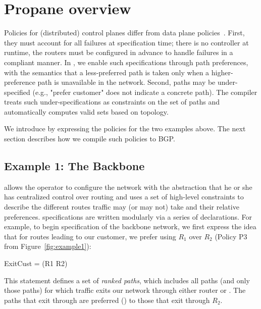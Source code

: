 \section{Propane overview}
\label{sec:propane}

Policies for (distributed) control planes differ from data plane policies~\cite{x,y,z}. First, they must account for all failures at specification time; there is no controller at runtime, the routers must be configured in advance to handle failures in a compliant manner.
%
In \sysname, we enable such specifications through path preferences, with the semantics that a less-preferred path is taken only when a higher-preference path is unavailable in the network.
%
Second, paths may be under-specified (e.g., "prefer customer" does not indicate a concrete path). The \sysname compiler treats such under-specifications as constraints on the set of paths and automatically computes valid sets based on topology.




We introduce \sysname by expressing the policies for the two examples above.
%
The next section describes how we compile such policies to BGP.

\subsection{Example 1: The Backbone}


\sysname allows the operator to configure the network with the abstraction that he or she has centralized control over routing and uses a set of high-level constraints to describe the different routes traffic may (or may not) take and their relative preferences.
\sysname specifications are written modularly via a series
of declarations.
For example, to begin specification of the backbone
network, we first express the idea that for routes leading to our customer,
we prefer using $R_1$ over $R_2$ (Policy P3 from Figure~\ref{fig:example1}):
\begin{code}
\Define ExitCust = \Exit(R1 \Prefer R2)
\end{code}
This  statement defines a set of \emph{ranked paths}, which includes
all paths (and only those paths) for which traffic exits our network
through either router  or .  The paths that exit through 
are preferred (\Prefer) to those that exit through $R_2$.

